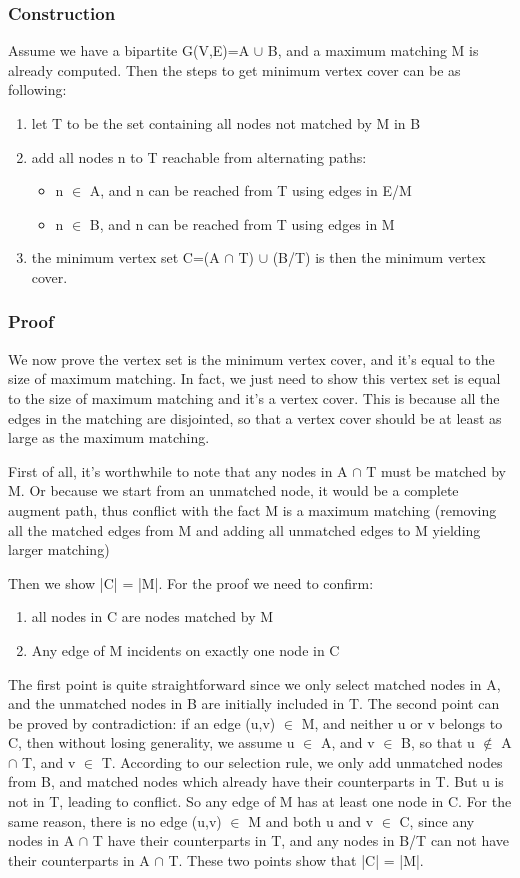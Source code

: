 \documentclass[paper=a4, fontsize=11pt]{scrartcl} %
\numberwithin{equation}{section} %
\numberwithin{figure}{section} %
\numberwithin{table}{section} %
\begin{document}
\subsubsection*{\textbf{Construction}}
Assume we have a bipartite G(V,E)=A $\cup$ B, and a maximum matching M is already
computed. Then the steps to get minimum vertex cover can be as following:
\begin{enumerate}
\item let T to be the set containing all nodes not matched by M in B
\item add all nodes n to T reachable from alternating paths:
\begin{itemize}
	\item n $\in$ A, and n can be reached from T using edges in E/M
	\item n $\in$ B, and n can be reached from T using edges in M
\end{itemize}
\item the minimum vertex set C=(A $\cap$ T) $\cup$ (B/T) is then the minimum vertex
cover.
\end{enumerate}

\subsubsection*{\textbf{Proof}}
We now prove the vertex set is the minimum vertex cover, and it's equal to the size of
maximum matching. In fact, we just need to show this vertex set is equal to the size
of maximum matching and it's a vertex cover. This is because all the edges in
the matching are disjointed, so that a vertex cover should be at least as large
as the maximum matching.

First of all, it's worthwhile to note that any nodes in A $\cap$ T must be
matched by M. Or because we start from an unmatched node, it would be a
complete augment path, thus conflict with the fact M is a maximum matching (removing
all the matched edges from M and adding all unmatched edges to M yielding larger
matching)

Then we show |C| = |M|. For the proof we need to confirm:
\begin{enumerate}
\item all nodes in C are nodes matched by M
\item Any edge of M incidents on exactly one node in C
\end{enumerate}

The first point is quite straightforward since we only select matched nodes in
A, and the unmatched nodes in B are initially included in T. The second point
can be proved by contradiction: if an edge (u,v) $\in$ M, and neither u or v belongs to C, then
without losing generality, we assume u $\in$ A, and v $\in$ B, so that u $\notin$ A $\cap$ T,
and v $\in$ T. According to our selection rule, we only add unmatched nodes from B, and matched
nodes which already have their counterparts in T. But u is not in T, leading to conflict. So
any edge of M has at least one node in C. For the same reason, there is no edge (u,v) $\in$
M and both u and v $\in$ C, since any nodes in A $\cap$ T have their counterparts in T, and
any nodes in B/T can not have their counterparts in A $\cap$ T. These two points show
that |C| = |M|.
\end{document}

